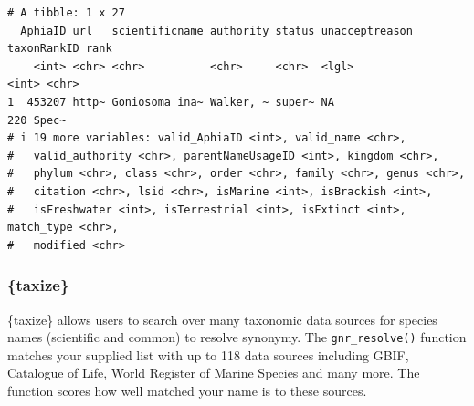 \documentclass[
  letterpaper,
  DIV=11,
  numbers=noendperiod,
  oneside]{scrreprt}
\newenvironment{Shaded}{\begin{snugshade}}{\end{snugshade}}
\newcommand{\CommentTok}[1]{\textcolor[rgb]{0.37,0.37,0.37}{#1}}
\newcommand{\FunctionTok}[1]{\textcolor[rgb]{0.28,0.35,0.67}{#1}}
\newcommand{\NormalTok}[1]{\textcolor[rgb]{0.00,0.23,0.31}{#1}}
\newcommand{\OtherTok}[1]{\textcolor[rgb]{0.00,0.23,0.31}{#1}}
\newcommand{\SpecialCharTok}[1]{\textcolor[rgb]{0.37,0.37,0.37}{#1}}
\newcommand{\StringTok}[1]{\textcolor[rgb]{0.13,0.47,0.30}{#1}}
\begin{document}
\begin{verbatim}
# A tibble: 1 x 27
  AphiaID url   scientificname authority status unacceptreason taxonRankID rank 
    <int> <chr> <chr>          <chr>     <chr>  <lgl>                <int> <chr>
1  453207 http~ Goniosoma ina~ Walker, ~ super~ NA                     220 Spec~
# i 19 more variables: valid_AphiaID <int>, valid_name <chr>,
#   valid_authority <chr>, parentNameUsageID <int>, kingdom <chr>,
#   phylum <chr>, class <chr>, order <chr>, family <chr>, genus <chr>,
#   citation <chr>, lsid <chr>, isMarine <int>, isBrackish <int>,
#   isFreshwater <int>, isTerrestrial <int>, isExtinct <int>, match_type <chr>,
#   modified <chr>
\end{verbatim}

\hypertarget{taxize}{%
\subsubsection*{\{taxize\}}\label{taxize}}

\{taxize\} allows users to search over many taxonomic data sources for
species names (scientific and common) to resolve synonymy. The
\texttt{gnr\_resolve()} function matches your supplied list with up to
118 data sources including GBIF, Catalogue of Life, World Register of
Marine Species and many more. The function scores how well matched your
name is to these sources.

\begin{Shaded}
\end{Shaded}
\end{document}
